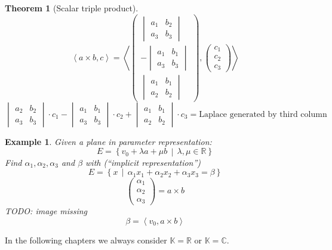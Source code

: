 \documentclass[a4paper,landscape,twocolumn]{article}
\newcommand\setdef[2]{\left\{#1\,\middle|\,#2\right\}}
\newcommand\functional[1]{\left\langle{#1}\right\rangle}
\newtheorem{theorem}{Theorem}
\newtheorem{ex}{Example}
\begin{document}
\begin{theorem}[Scalar triple product]
  \[
    \functional{a \times b, c} = \functional{
      \begin{pmatrix}
        \begin{vmatrix}
          a_1 & b_2 \\
          a_3 & b_3
        \end{vmatrix} \\
        - \begin{vmatrix}
          a_1 & b_1 \\
          a_3 & b_3
        \end{vmatrix} \\
        \begin{vmatrix}
          a_1 & b_1 \\
          a_2 & b_2
        \end{vmatrix}
      \end{pmatrix},
      \begin{pmatrix} c_1 \\ c_2 \\ c_3 \end{pmatrix}
    }
  \] \[
    \begin{vmatrix} a_2 & b_2 \\ a_3 & b_3 \end{vmatrix} \cdot c_1
    - \begin{vmatrix} a_1 & b_1 \\ a_3 & b_3 \end{vmatrix} \cdot c_2
    + \begin{vmatrix} a_1 & b_1 \\ a_2 & b_2 \end{vmatrix} \cdot c_3
    = \text{Laplace generated by third column}
  \]
\end{theorem}
\begin{ex}
  \label{application-8.12}
  Given a plane in parameter representation:
  \[ E = \setdef{v_0 + \lambda a + \mu b}{\lambda, \mu \in \mathbb R} \]
  Find $\alpha_1, \alpha_2, \alpha_3$ and $\beta$ with (\enquote{implicit representation})
  \[ E = \setdef{x}{\alpha_1 x_1 + \alpha_2 x_2 + \alpha_3 x_3 = \beta}\]
  \[
    \begin{pmatrix} \alpha_1 \\ \alpha_2 \\ \alpha_3 \end{pmatrix}
    = a \times b
  \]
  TODO: image missing
  \[ \beta = \functional{v_0, a \times b} \]
\end{ex}

In the following chapters we always consider $\mathbb K = \mathbb R$ or $\mathbb K = \mathbb C$.
\end{document}
